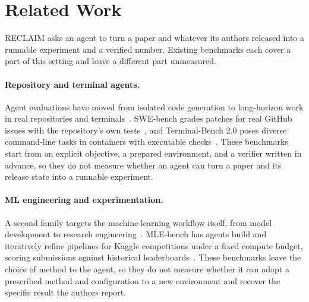 \documentclass{article} %
\begin{document}
\section{Related Work}
\label{sec:related-work}

RECLAIM asks an agent to turn a paper and whatever its authors released
into a runnable experiment and a verified number. Existing benchmarks
each cover a part of this setting and leave a different part unmeasured.

\paragraph{Repository and terminal agents.}
Agent evaluations have moved from isolated code generation to long-horizon
work in real repositories and
terminals~\citep{jimenez2024swebench,merrill2026terminalbench,
miserendino2025swelancer,deng2025swebenchpro,lu2026frontiercode}. SWE-bench
grades patches for real GitHub issues with the repository's own
tests~\citep{jimenez2024swebench}, and Terminal-Bench 2.0 poses diverse
command-line tasks in containers with executable
checks~\citep{merrill2026terminalbench}. These benchmarks start from an
explicit objective, a prepared environment, and a verifier written in
advance, so they do not measure whether an agent can turn a paper and its
release state into a runnable experiment.

\paragraph{ML engineering and experimentation.}
A second family targets the machine-learning workflow itself, from model
development to research engineering~\citep{huang2024mlagentbench,
nathani2025mlgym,tang2024mlbench,jing2025dsbench,zhang2025datascibench,
wijk2024rebench,zhang2025mlrcbench,lupidi2026airsbench}. MLE-bench has
agents build and iteratively refine pipelines for Kaggle competitions under
a fixed compute budget, scoring submissions against historical
leaderboards~\citep{chan2024mlebench}. These benchmarks leave the choice of
method to the agent, so they do not measure whether it can adapt a
prescribed method and configuration to a new environment and recover the
specific result the authors report.
\end{document}
